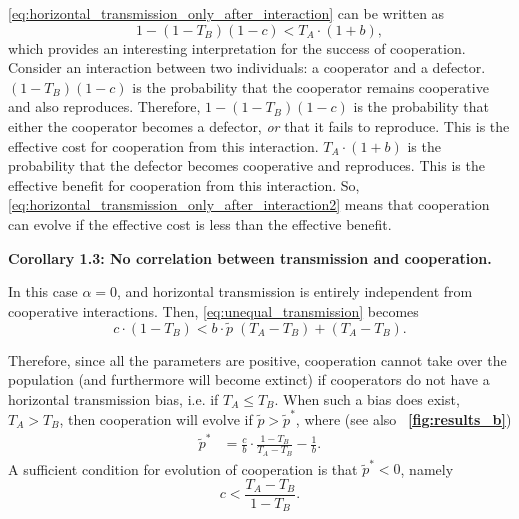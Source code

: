 \documentclass[12pt]{extarticle}
\begin{document}
\autoref{eq:horizontal_transmission_only_after_interaction} can be written as
\begin{equation} \label{eq:horizontal_transmission_only_after_interaction2}
1 - (1-T_B)(1-c) < T_A \cdot (1+b) ,
\end{equation}
which provides an interesting interpretation for the success of cooperation. 
Consider an interaction between two individuals: a cooperator and a defector.
$(1-T_B)(1-c)$ is the probability that the cooperator remains cooperative and also reproduces. 
Therefore, $1 - (1-T_B)(1-c)$ is the probability that either the cooperator becomes a defector, \emph{or} that it fails to reproduce.
This is the effective cost for cooperation from this interaction.
$T_A\cdot(1+b)$ is the probability that the defector becomes cooperative and reproduces.
This is the effective benefit for cooperation from this interaction.
So, \autoref{eq:horizontal_transmission_only_after_interaction2} means that cooperation can evolve if the effective cost is less than the effective benefit.

\textbf{Corollary 1.3: No correlation between transmission and cooperation.}

In this case $\alpha=0$, and horizontal transmission is entirely independent from cooperative interactions.  
Then, \autoref{eq:unequal_transmission} becomes
\begin{equation} \label{eq:horizontal_transmission_from_population}
c\cdot(1-T_B) < b \cdot \tilde{p} \;(T_A-T_B) + (T_A-T_B). 
\end{equation}

Therefore, since all the parameters are  positive, cooperation cannot take over the population (and furthermore will become extinct) if cooperators do not have a horizontal transmission bias, i.e. if $T_A\leq T_B$.
When such a bias does exist, $T_A > T_B$, then cooperation will evolve if $\tilde{p} > \tilde{p}^{*}$, where (see also ~\textbf{\autoref{fig:results_b}})
\begin{equation} 
\begin{split} \label{eq:horizontal_transmission_from_population_equilibrium}
\tilde{p}^{*} & = \frac{c}{b} \cdot \frac{1-T_B}{T_A-T_B} - \frac{1}{b}.
\end{split}
\end{equation}
A sufficient condition for evolution of cooperation is that $\tilde{p}^{*} < 0$, namely
\begin{equation} \label{eq:sufficient_horizontal_transmission_from_population}
c < \frac{T_A-T_B}{1-T_B} .  
\end{equation}
\end{document}
